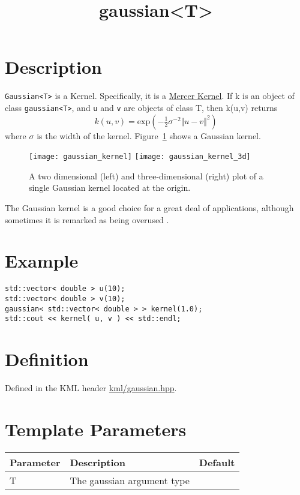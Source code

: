 \documentclass{article}
\newcommand{\half}{\tfrac{1}{2}}
\begin{document}
\title{gaussian<T>}
\maketitle

\section*{Description}

\texttt{Gaussian<T>} is a Kernel. Specifically, it is a \href{\kmlroot/reference/mercer_kernel.html}{Mercer Kernel}. If k is an object of class \texttt{gaussian<T>}, and \texttt{u} and \texttt{v} are objects of class T, then k(u,v) returns
%
$$k(u,v) = \textrm{exp}( - \half \sigma^{-2} \Vert u-v \Vert^2 ) $$
%
where $\sigma$ is the width of the kernel. 
Figure~\ref{figure:gaussian_kernel} shows a Gaussian kernel.

\begin{figure}
\texttt{[image: gaussian\_kernel]}
\texttt{[image: gaussian\_kernel\_3d]}
\caption{A two dimensional (left) and three-dimensional (right) plot of a single Gaussian kernel located at the origin.}
\label{figure:gaussian_kernel}
\end{figure}

The Gaussian kernel is a good choice for a great deal of applications, although sometimes it is remarked as being
overused \cite{scholkopf02learning}.


\section*{Example}


\highlightcpp{}
\begin{verbatim}
std::vector< double > u(10);
std::vector< double > v(10);
gaussian< std::vector< double > > kernel(1.0);
std::cout << kernel( u, v ) << std::endl;
\end{verbatim}


\section*{Definition}

Defined in the KML header \href{\kmlsvnroot/kml/gaussian.hpp}{kml/gaussian.hpp}.


\section*{Template Parameters}

\begin{tabular}{lll}
\textbf{Parameter} & \textbf{Description} & \textbf{Default} \\ 
\hline
T & The gaussian argument type \\ 
\end{tabular}
\end{document}

